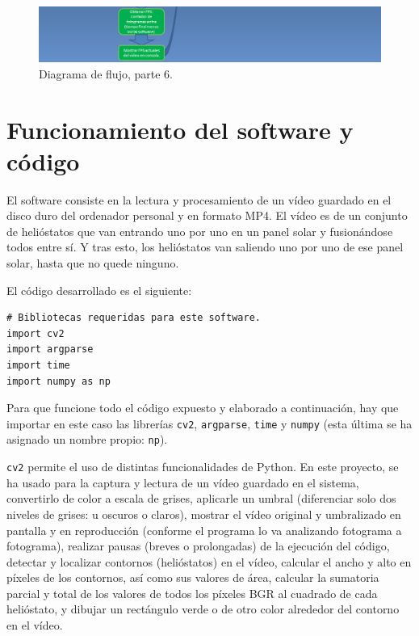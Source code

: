 \begin{figure}[h!]
  	\centering
	\includegraphics[width=\textwidth]{DiagramaFlujoSoftwareTFG/diagramaFlujo6.PNG}
	\caption{Diagrama de flujo, parte 6.
	\label{fig:DiagramaFlujoSoftwareTFG/diagramaFlujo6.PNG}}
\end{figure}

\section{Funcionamiento del software y código}

El software consiste en la lectura y procesamiento de un vídeo guardado en el disco duro del ordenador personal y en formato MP4. El vídeo es de un conjunto de helióstatos que van entrando uno por uno en un panel solar y fusionándose todos entre sí. Y tras esto, los helióstatos van saliendo uno por uno de ese panel solar, hasta que no quede ninguno.

El código desarrollado es el siguiente:

\begin{lstlisting}
# Bibliotecas requeridas para este software.
import cv2
import argparse
import time
import numpy as np
\end{lstlisting}

Para que funcione todo el código expuesto y elaborado a continuación, hay que importar en este caso las librerías \verb|cv2|, \verb|argparse|, \verb|time| y \verb|numpy| (esta última se ha asignado un nombre propio: \verb|np|).

\verb|cv2| permite el uso de distintas funcionalidades de Python. En este proyecto, se ha usado para la captura y lectura de un vídeo guardado en el sistema, convertirlo de color a escala de grises, aplicarle un umbral (diferenciar solo dos niveles de grises: u oscuros o claros), mostrar el vídeo original y umbralizado en pantalla y en reproducción (conforme el programa lo va analizando fotograma a fotograma), realizar pausas (breves o prolongadas) de la ejecución del código, detectar y localizar contornos (helióstatos) en el vídeo, calcular el ancho y alto en píxeles de los contornos, así como sus valores de área, calcular la sumatoria parcial y total de los valores de todos los píxeles BGR al cuadrado de cada helióstato, y dibujar un rectángulo verde o de otro color alrededor del contorno en el vídeo.

